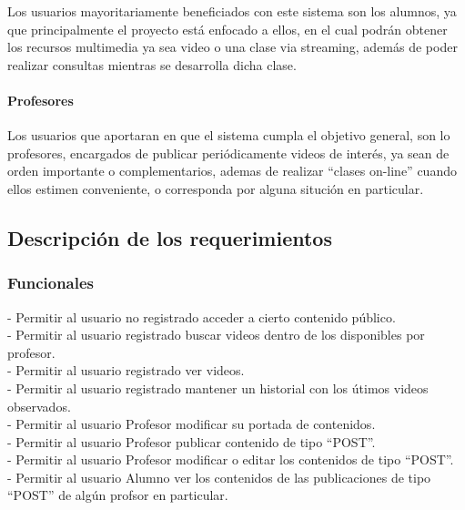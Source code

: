 \documentclass[12pt]{article}
\begin{document}
Los usuarios mayoritariamente beneficiados con este sistema son los alumnos, ya que principalmente
el proyecto está enfocado a ellos, en el cual podrán obtener los recursos multimedia ya sea video
o una clase via streaming, además de poder realizar consultas mientras se desarrolla dicha clase.

\paragraph{Profesores\\}

Los usuarios que aportaran en que el sistema cumpla el objetivo general, son lo profesores, 
encargados de publicar periódicamente videos de interés, ya sean de orden importante o complementarios, 
ademas de realizar ``clases on-line'' cuando ellos estimen conveniente, o corresponda por alguna situción
en particular.
\subsection{Descripción de los requerimientos}
\subsubsection{Funcionales}

- Permitir al usuario no registrado acceder a cierto contenido público.\\


- Permitir al usuario registrado buscar videos dentro de los disponibles por profesor.\\

- Permitir al usuario registrado ver videos.\\

- Permitir al usuario registrado mantener un historial con los útimos videos observados.\\ 

- Permitir al usuario Profesor modificar su portada de contenidos.\\

- Permitir al usuario Profesor publicar contenido de tipo ``POST''.\\

- Permitir al usuario Profesor modificar o editar los contenidos de tipo ``POST''.\\

- Permitir al usuario Alumno ver los contenidos de las publicaciones de tipo ``POST'' de algún profsor en 
particular.\\
\end{document}

